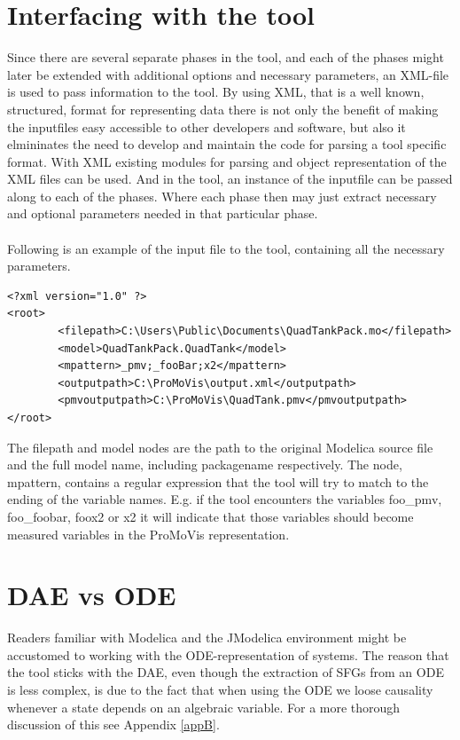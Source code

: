 \section{Interfacing with the tool}
Since there are several separate phases in the tool, and each of the phases might later be extended with additional options and necessary parameters, an XML-file is used to pass information to the tool. By using XML, that is a well known, structured, format for representing data there is not only the benefit of making the inputfiles easy accessible to other developers and software, but also it elmininates the need to develop and maintain the code for parsing a tool specific format. With XML existing modules for parsing and object representation of the XML files can be used. And in the tool, an instance of the inputfile can be passed along to each of the phases. Where each phase then may just extract necessary and optional parameters needed in that particular phase. \\\\Following is an example of the input file to the tool, containing all the necessary parameters.
\lstset{language=XML}
\begin{lstlisting}
<?xml version="1.0" ?> 
<root>
        <filepath>C:\Users\Public\Documents\QuadTankPack.mo</filepath>
        <model>QuadTankPack.QuadTank</model>
        <mpattern>_pmv;_fooBar;x2</mpattern>
        <outputpath>C:\ProMoVis\output.xml</outputpath>
        <pmvoutputpath>C:\ProMoVis\QuadTank.pmv</pmvoutputpath>
</root>
\end{lstlisting}
The filepath and model nodes are the path to the original Modelica source file and the full model name, including packagename respectively. The node, mpattern, contains a regular expression that the tool will try to match to the ending of the variable names. E.g. if the tool encounters the variables foo\_pmv, foo\_foobar, foox2 or x2 it will indicate that those variables should become measured variables in the ProMoVis representation.


\section{DAE vs ODE}
Readers familiar with Modelica and the JModelica environment might be accustomed to working with the ODE-representation of systems. The reason that the tool sticks with the DAE, even though the extraction of SFGs from an ODE is less complex, is due to the fact that when using the ODE we loose causality whenever a state depends on an algebraic variable. For a more thorough discussion of this see Appendix \ref{appB}.


